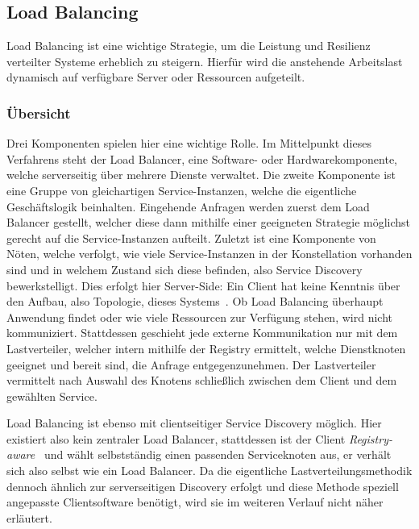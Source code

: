 \subsection{Load Balancing}
Load Balancing ist eine wichtige Strategie, um die Leistung und Resilienz verteilter Systeme erheblich zu steigern.
Hierfür wird die anstehende Arbeitslast dynamisch auf verfügbare Server oder Ressourcen aufgeteilt.

\subsubsection{Übersicht}
Drei Komponenten spielen hier eine wichtige Rolle.
Im Mittelpunkt dieses Verfahrens steht der Load Balancer, eine Software- oder Hardwarekomponente, welche serverseitig
über mehrere Dienste verwaltet.
Die zweite Komponente ist eine Gruppe von gleichartigen Service-Instanzen, welche die eigentliche Geschäftslogik beinhalten.
Eingehende Anfragen werden zuerst dem Load Balancer gestellt, welcher diese dann mithilfe einer geeigneten Strategie
möglichst gerecht auf die Service-Instanzen aufteilt.
Zuletzt ist eine Komponente von Nöten, welche verfolgt, wie viele Service-Instanzen in der Konstellation vorhanden
sind und in welchem Zustand sich diese befinden, also Service Discovery bewerkstelligt.
Dies erfolgt hier Server-Side: Ein Client hat keine Kenntnis über den Aufbau, also Topologie, dieses Systems~\cite{schoner2017analyse}.
Ob Load Balancing überhaupt Anwendung findet oder wie viele Ressourcen zur Verfügung stehen, wird nicht kommuniziert.
Stattdessen geschieht jede externe Kommunikation nur mit dem Lastverteiler, welcher intern mithilfe der Registry ermittelt,
welche Dienstknoten geeignet und bereit sind, die Anfrage entgegenzunehmen.
Der Lastverteiler vermittelt nach Auswahl des Knotens schließlich zwischen dem Client und dem gewählten Service.

Load Balancing ist ebenso mit clientseitiger Service Discovery möglich.
Hier existiert also kein zentraler Load Balancer, stattdessen ist der Client \textit{Registry-aware}~\cite{schoner2017analyse}
und wählt selbstständig einen passenden Serviceknoten aus, er verhält sich also selbst wie ein Load Balancer.
Da die eigentliche Lastverteilungsmethodik dennoch ähnlich zur serverseitigen Discovery erfolgt und diese Methode
speziell angepasste Clientsoftware benötigt, wird sie im weiteren Verlauf nicht näher erläutert.

